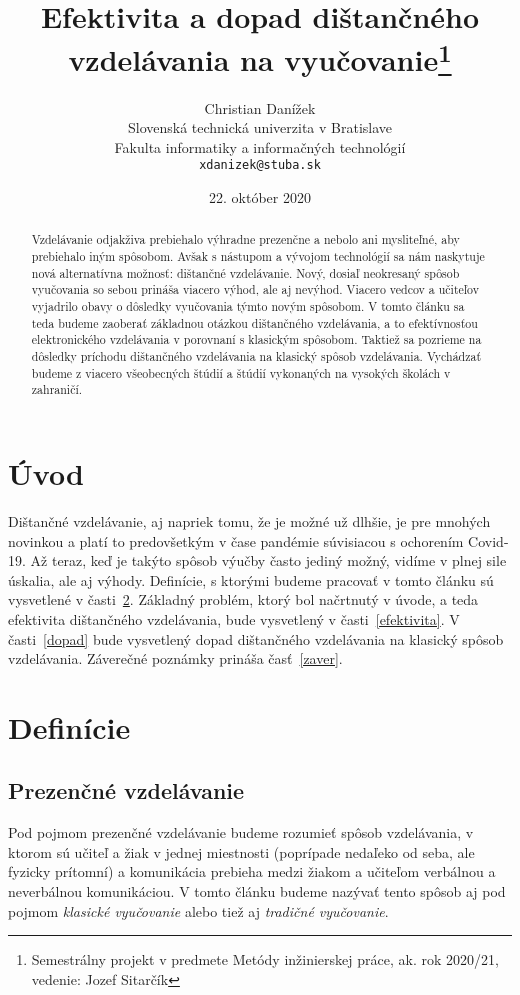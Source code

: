 \documentclass[10pt,twoside,slovak,a4paper]{article}
\title{Efektivita a dopad dištančného vzdelávania na vyučovanie\thanks{Semestrálny projekt v predmete Metódy inžinierskej práce, ak. rok 2020/21, vedenie: Jozef Sitarčík}}
\author{Christian Danížek\\[2pt]
	{\small Slovenská technická univerzita v Bratislave}\\
	{\small Fakulta informatiky a informačných technológií}\\
	{\small \texttt{xdanizek@stuba.sk}}
	}
\date{\small 22. október 2020} %
\begin{document}
\maketitle


\begin{abstract}
Vzdelávanie odjakživa prebiehalo výhradne prezenčne a  nebolo ani mysliteľné, aby prebiehalo iným spôsobom. Avšak s nástupom a vývojom technológií sa nám naskytuje nová alternatívna možnosť: dištančné vzdelávanie. Nový, dosiaľ neokresaný spôsob vyučovania so sebou prináša viacero výhod, ale aj nevýhod. Viacero vedcov a učiteľov vyjadrilo obavy o dôsledky vyučovania týmto novým spôsobom. V tomto článku sa teda budeme zaoberať základnou otázkou dištančného vzdelávania, a to efektívnosťou elektronického vzdelávania v porovnaní s klasickým spôsobom. Taktiež sa pozrieme na dôsledky príchodu dištančného vzdelávania na klasický spôsob vzdelávania. Vychádzať budeme z viacero všeobecných štúdií a štúdií vykonaných na vysokých školách v zahraničí.
\end{abstract}

\section{Úvod}

Dištančné vzdelávanie, aj napriek tomu, že je možné už dlhšie, je pre mnohých novinkou a platí to predovšetkým v čase pandémie súvisiacou s ochorením Covid-19. Až teraz, keď je takýto spôsob výučby často jediný možný, vidíme v plnej sile úskalia, ale aj výhody\cite{Zimmerman:Experiment}. Definície, s ktorými budeme pracovať v tomto článku sú vysvetlené v časti~\ref{definicie}. Základný problém, ktorý bol načrtnutý v úvode, a teda efektivita dištančného vzdelávania, bude vysvetlený v časti~\ref{efektivita}. V časti~\ref{dopad} bude vysvetlený dopad dištančného vzdelávania na klasický spôsob vzdelávania. Záverečné poznámky prináša časť~\ref{zaver}.

\section{Definície} \label{definicie}
\subsection{Prezenčné vzdelávanie}
Pod pojmom prezenčné vzdelávanie budeme rozumieť spôsob vzdelávania, v ktorom sú učiteľ a žiak v jednej miestnosti (poprípade nedaľeko od seba, ale fyzicky prítomní) a komunikácia prebieha medzi žiakom a učiteľom verbálnou a neverbálnou komunikáciou. V tomto článku budeme nazývať tento spôsob aj pod pojmom \textit{klasické vyučovanie} alebo tiež aj \textit{tradičné vyučovanie}.
\end{document}
